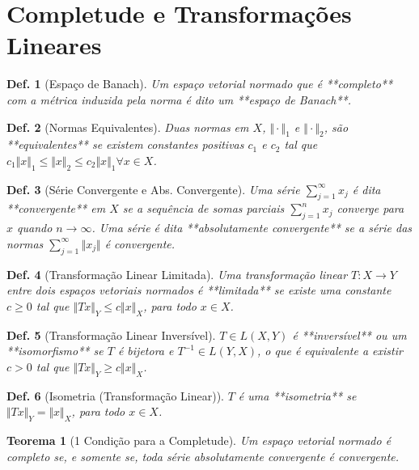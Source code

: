 \documentclass[11pt]{article}
\theoremstyle{yellowhead}
\newtheorem*{theorem}{Teorema}
\theoremstyle{yellowdef}
\newtheorem*{definition}{Def.}
\begin{document}
\section{Completude e Transformações Lineares}
\begin{multicols}{3}
\begin{definition}[Espaço de Banach]
Um espaço vetorial normado que é **completo** com a métrica induzida pela norma é dito um **espaço de Banach**.
\end{definition}

\begin{definition}[Normas Equivalentes]
Duas normas em $X$, $\Vert \cdot \Vert_1$ e $\Vert \cdot \Vert_2$, são **equivalentes** se existem constantes positivas $c_1$ e $c_2$ tal que $c_1\Vert x \Vert_1 \le \Vert x \Vert_2 \le c_2\Vert x \Vert_1 \forall x \in X$.
\end{definition}

\begin{definition}[Série Convergente e Abs. Convergente]
Uma série $\sum_{j=1}^{\infty} x_j$ é dita **convergente** em $X$ se a sequência de somas parciais $\sum_{j=1}^{n} x_j$ converge para $x$ quando $n \rightarrow \infty$. Uma série é dita **absolutamente convergente** se a série das normas $\sum_{j=1}^{\infty} \Vert x_j \Vert$ é convergente.
\end{definition}

\begin{definition}[Transformação Linear Limitada]
Uma transformação linear $T : X \rightarrow Y$ entre dois espaços vetoriais normados é **limitada** se existe uma constante $c \ge 0$ tal que $\Vert Tx \Vert_Y \le c\Vert x \Vert_X$, para todo $x \in X$.
\end{definition}

\begin{definition}[Transformação Linear Inversível]
$T \in L(X ,Y )$ é **inversível** ou um **isomorfismo** se $T$ é bijetora e $T^{-1} \in L(Y ,X )$, o que é equivalente a existir $c > 0$ tal que $\Vert Tx \Vert_Y \ge c\Vert x \Vert_X$.
\end{definition}

\begin{definition}[Isometria (Transformação Linear)]
$T$ é uma **isometria** se $\Vert Tx \Vert_Y = \Vert x \Vert_X$, para todo $x \in X$.
\end{definition}

\begin{theorem}[1 Condição para a Completude]
Um espaço vetorial normado é completo se, e somente se, toda série absolutamente convergente é convergente.
\end{theorem}


\end{multicols}
\end{document}
